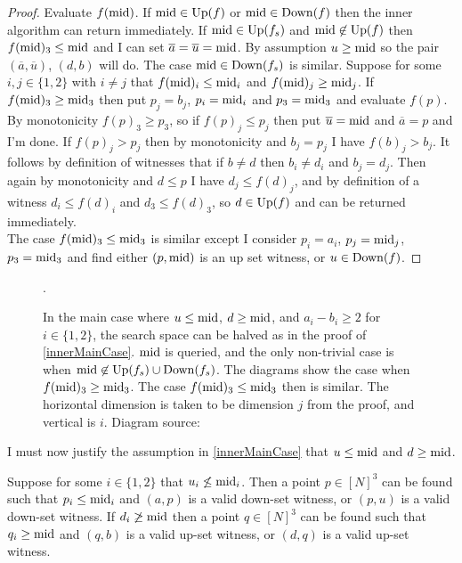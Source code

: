 \begin{proof} 
  Evaluate $f(\mathrm{mid})$. If $\mathrm{mid} \in \mathrm{Up}(f)$ or
  $\mathrm{mid} \in \mathrm{Down}(f)$ then the inner algorithm can return immediately. If $\mathrm{mid} \in \mathrm{Up}(f_s)$ and $\mathrm{mid} \not\in \mathrm{Up}(f)$
  then $f(\mathrm{mid})_3 \leq \mathrm{mid}$ and I can set
  $\overline{a} = \overline{u} = \mathrm{mid}$. By assumption $u \geq \mathrm{mid}$ so the pair $(\overline{a}, \overline{u})$, $(d, b)$ will do.
  The case $\mathrm{mid} \in \mathrm{Down}(f_s)$ is similar.
  Suppose for some $i, j \in \{1, 2\}$ with $i \neq j$ that $f(\mathrm{mid})_i \leq \mathrm{mid}_i$ and $f(\mathrm{mid})_j \geq \mathrm{mid}_j$.
  If $f(\mathrm{mid})_3 \geq \mathrm{mid}_3$ then put $p_j = b_j$, $p_i = \mathrm{mid}_i$ and $p_3 = \mathrm{mid}_3$ and evaluate $f(p)$.  
  By monotonicity $f(p)_3 \geq p_3$, so if $f(p)_j \leq p_j$ then put $\overline{u} = \mathrm{mid}$ and $\overline{a} = p$ and I'm done.
  If $f(p)_j > p_j$ then by monotonicity and $b_j = p_j$ I have $f(b)_j > b_j$. It follows by definition of witnesses that if $b \neq d$ then 
  $b_i \neq d_i$ and $b_j = d_j$. Then again by monotonicity and $d \leq p$ I have $d_j \leq f(d)_j$, and by definition
  of a witness $d_i \leq f(d)_i$ and $d_3 \leq f(d)_3$, so $d \in \mathrm{Up}(f)$ and can be returned immediately. \\
  The case $f(\mathrm{mid})_3 \leq \mathrm{mid}_3$ is similar except I consider $p_i = a_i$, $p_j = \mathrm{mid}_j$, $p_3 = \mathrm{mid}_3$ and
  find either $(p, \mathrm{mid})$ is an up set witness, or $u \in \mathrm{Down}(f)$.
\end{proof}
\begin{figure}[ht]
  \centering
  \scalebox{0.5}{}
  \caption{In the main case where $u \leq \mathrm{mid}$, $d \geq \mathrm{mid}$, and $a_i - b_i \geq 2$ for $i \in \{ 1, 2\}$,
  the search space can be halved as in the proof of \cref{innerMainCase}. $\mathrm{mid}$ is queried, and the only non-trivial
  case is when $\mathrm{mid} \not\in \mathrm{Up}(f_s) \cup \mathrm{Down}(f_s)$. The diagrams show the case when $f(\mathrm{mid})_3 \geq \mathrm{mid}_3$.
  The case $f(\mathrm{mid})_3 \leq \mathrm{mid}_3$ then is similar. The horizontal dimension is taken to be dimension $j$ from the proof,
  and vertical is $i$. Diagram source: \citep{fasterTarski}}.
\end{figure}
I must now justify the assumption in \cref{innerMainCase} that 
$u \leq \mathrm{mid}$ and $d \geq \mathrm{mid}$.
\begin{lemma}\label{innerOtherCase}
  Suppose for some $i \in \{1, 2\}$ that $u_i \not\leq \mathrm{mid}_i$.
  Then a point $p \in [N]^3$ can be found such that $p_i \leq \mathrm{mid}_i$ and $(a, p)$ is a valid down-set
  witness, or $(p, u)$ is a valid down-set witness. 
  If $d_i \not\geq \mathrm{mid}$ then a point $q \in [N]^3$ can be found such that $q_i \geq \mathrm{mid}$
  and $(q, b)$ is a valid up-set
  witness, or $(d, q)$ is a valid up-set witness. 
\end{lemma}

